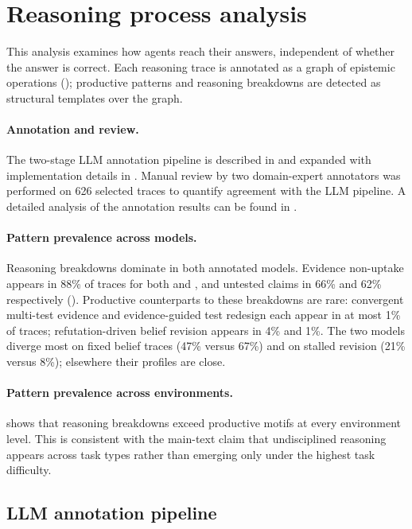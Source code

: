 \section{Reasoning process analysis}
\label{app:reasoning-process}

This analysis examines how agents reach their answers, independent of whether the answer is correct. Each reasoning trace is annotated as a graph of epistemic operations (); productive patterns and reasoning breakdowns are detected as structural templates over the graph.

\paragraph{Annotation and review.} The two-stage LLM annotation pipeline is described in  and expanded with implementation details in . Manual review by two domain-expert annotators was performed on 626 selected traces to quantify agreement with the LLM pipeline. A detailed analysis of the annotation results can be found in .

\paragraph{Pattern prevalence across models.} Reasoning breakdowns dominate in both annotated models. Evidence non-uptake appears in 88\% of traces for both \claudesonnet and \gptfourO, and untested claims in 66\% and 62\% respectively (). Productive counterparts to these breakdowns are rare: convergent multi-test evidence and evidence-guided test redesign each appear in at most 1\% of traces; refutation-driven belief revision appears in 4\% and 1\%. The two models diverge most on fixed belief traces (47\% versus 67\%) and on stalled revision (21\% versus 8\%); elsewhere their profiles are close.

\paragraph{Pattern prevalence across environments.}  shows that reasoning breakdowns exceed productive motifs at every environment level. This is consistent with the main-text claim that undisciplined reasoning appears across task types rather than emerging only under the highest task difficulty.


\subsection{LLM annotation pipeline}
\label{app:annotation-pipeline}

